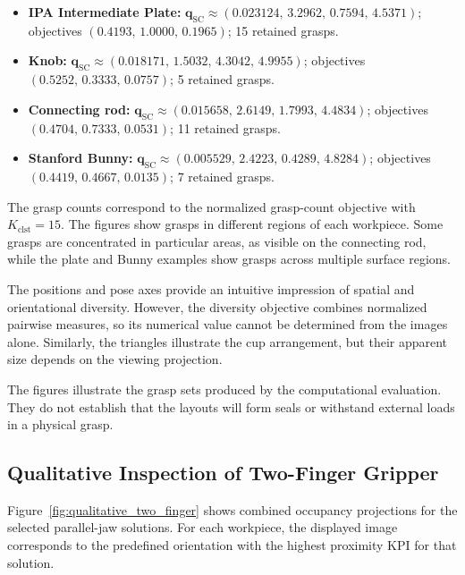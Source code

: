 \begin{itemize}
    \item \textbf{IPA Intermediate Plate:}
    $\mathbf{q}_{\mathrm{SC}}\approx
    (0.023124,\,3.2962,\,0.7594,\,4.5371)$;
    objectives $(0.4193,\,1.0000,\,0.1965)$;
    15 retained grasps.

    \item \textbf{Knob:}
    $\mathbf{q}_{\mathrm{SC}}\approx
    (0.018171,\,1.5032,\,4.3042,\,4.9955)$;
    objectives $(0.5252,\,0.3333,\,0.0757)$;
    5 retained grasps.

    \item \textbf{Connecting rod:}
    $\mathbf{q}_{\mathrm{SC}}\approx
    (0.015658,\,2.6149,\,1.7993,\,4.4834)$;
    objectives $(0.4704,\,0.7333,\,0.0531)$;
    11 retained grasps.

    \item \textbf{Stanford Bunny:}
    $\mathbf{q}_{\mathrm{SC}}\approx
    (0.005529,\,2.4223,\,0.4289,\,4.8284)$;
    objectives $(0.4419,\,0.4667,\,0.0135)$;
    7 retained grasps.
\end{itemize}

The grasp counts correspond to the normalized grasp-count objective
with $K_{\mathrm{clst}}=15$. The figures show grasps in different
regions of each workpiece. Some grasps are concentrated in particular
areas, as visible on the connecting rod, while the plate and Bunny
examples show grasps across multiple surface regions.

The positions and pose axes provide an intuitive impression of spatial
and orientational diversity. However, the diversity objective combines
normalized pairwise measures, so its numerical value cannot be
determined from the images alone. Similarly, the triangles illustrate
the cup arrangement, but their apparent size depends on the viewing
projection.

The figures illustrate the grasp sets produced by the computational
evaluation. They do not establish that the layouts will form seals or
withstand external loads in a physical grasp.

\subsection{Qualitative Inspection of Two-Finger Gripper}
\label{subsec:qualitative_two_finger}

Figure~\ref{fig:qualitative_two_finger} shows combined occupancy
projections for the selected parallel-jaw solutions. For each
workpiece, the displayed image corresponds to the predefined
orientation with the highest proximity KPI for that solution.

